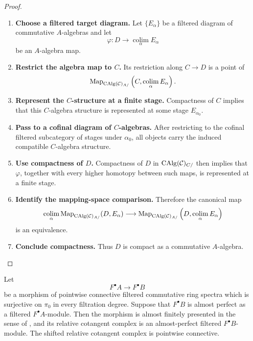 \begin{proof}
\leavevmode
\begin{enumerate}[label=\textup{(\arabic*)}]
    \item \textbf{Choose a filtered target diagram.}
    Let \(\{E_\alpha\}\) be a filtered diagram of commutative \(A\)-algebras and
    let
    \[
        \varphi:D\longrightarrow\operatorname*{colim}_\alpha E_\alpha
    \]
    be an \(A\)-algebra map.
    \item \textbf{Restrict the algebra map to \(C\).}
    Its restriction along \(C\to D\) is a point of
    \[
        \operatorname{Map}_{\operatorname{CAlg}(\mathcal C)_{A/}}
        \left(C,\operatorname*{colim}_\alpha E_\alpha\right).
    \]
    \item \textbf{Represent the \(C\)-structure at a finite stage.}
    Compactness of \(C\) implies that this \(C\)-algebra structure is represented
    at some stage \(E_{\alpha_0}\).
    \item \textbf{Pass to a cofinal diagram of \(C\)-algebras.}
    After restricting to the cofinal filtered
    subcategory of stages under \(\alpha_0\), all objects carry the induced
    compatible \(C\)-algebra structure.
    \item \textbf{Use compactness of \(D\).}
    Compactness of \(D\) in
    \(\operatorname{CAlg}(\mathcal C)_{C/}\) then implies that \(\varphi\), together with every higher homotopy
    between such maps, is represented at a finite stage.
    \item \textbf{Identify the mapping-space comparison.}
    Therefore the canonical
    map
    \[
        \operatorname*{colim}_\alpha
        \operatorname{Map}_{\operatorname{CAlg}(\mathcal C)_{A/}}(D,E_\alpha)
        \longrightarrow
        \operatorname{Map}_{\operatorname{CAlg}(\mathcal C)_{A/}}
        \left(D,\operatorname*{colim}_\alpha E_\alpha\right)
    \]
    is an equivalence.
    \item \textbf{Conclude compactness.}
    Thus \(D\) is compact as a commutative \(A\)-algebra.
\end{enumerate}
\end{proof}

\begin{lemma}
\label{lem:filtered-surjective-almost-finite}
Let
\[
    F^\bullet A\longrightarrow F^\bullet B
\]
be a morphism of pointwise connective filtered commutative ring spectra which
is surjective on \(\pi_0\) in every filtration degree. Suppose that
\(F^\bullet B\) is almost perfect as a filtered \(F^\bullet A\)-module. Then
the morphism is almost finitely presented in the sense of
, and its relative
cotangent complex is an almost-perfect filtered \(F^\bullet B\)-module. The
shifted relative cotangent complex is pointwise connective.
\end{lemma}

